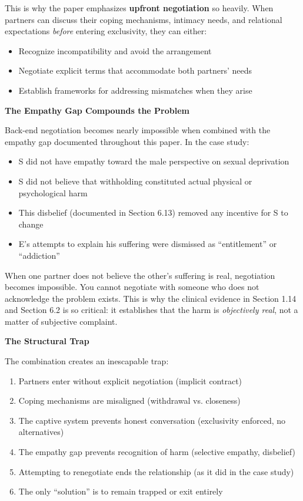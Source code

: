 \documentclass[12pt,openany]{book}
\numberwithin{equation}{chapter}
\begin{document}
This is why the paper emphasizes \textbf{upfront negotiation} so heavily. When partners can discuss their coping mechanisms, intimacy needs, and relational expectations \textit{before} entering exclusivity, they can either:
\begin{itemize}
    \item Recognize incompatibility and avoid the arrangement
    \item Negotiate explicit terms that accommodate both partners' needs
    \item Establish frameworks for addressing mismatches when they arise
\end{itemize}

\textbf{The Empathy Gap Compounds the Problem}

Back-end negotiation becomes nearly impossible when combined with the empathy gap documented throughout this paper. In the case study:

\begin{itemize}
    \item S did not have empathy toward the male perspective on sexual deprivation
    \item S did not believe that withholding constituted actual physical or psychological harm
    \item This disbelief (documented in Section 6.13) removed any incentive for S to change
    \item E's attempts to explain his suffering were dismissed as ``entitlement'' or ``addiction''
\end{itemize}

When one partner does not believe the other's suffering is real, negotiation becomes impossible. You cannot negotiate with someone who does not acknowledge the problem exists. This is why the clinical evidence in Section 1.14 and Section 6.2 is so critical: it establishes that the harm is \textit{objectively real}, not a matter of subjective complaint.

\textbf{The Structural Trap}

The combination creates an inescapable trap:
\begin{enumerate}
    \item Partners enter without explicit negotiation (implicit contract)
    \item Coping mechanisms are misaligned (withdrawal vs. closeness)
    \item The captive system prevents honest conversation (exclusivity enforced, no alternatives)
    \item The empathy gap prevents recognition of harm (selective empathy, disbelief)
    \item Attempting to renegotiate ends the relationship (as it did in the case study)
    \item The only ``solution'' is to remain trapped or exit entirely
\end{enumerate}
\end{document}
